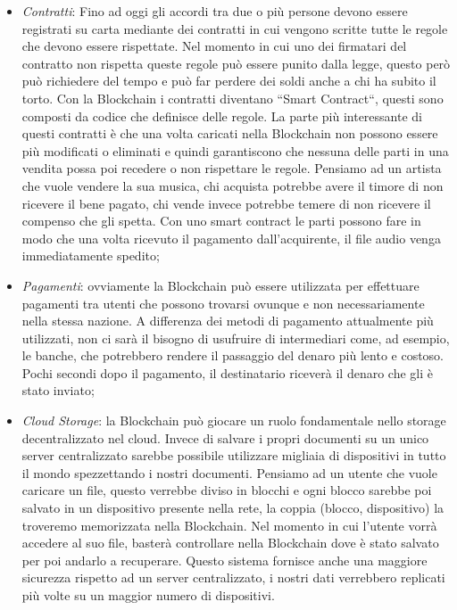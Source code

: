 \documentclass[12pt]{report}
\begin{document}
\begin{itemize}
\item \textit{Contratti}: Fino ad oggi gli accordi tra due o più persone devono essere registrati su carta mediante dei contratti in cui vengono scritte tutte le regole che devono essere rispettate. 
Nel momento in cui uno dei firmatari del contratto non rispetta queste regole può essere punito dalla legge, questo però può richiedere del tempo e può far perdere dei soldi anche a chi ha subito il torto.
Con la Blockchain i contratti diventano ``Smart Contract``, questi sono composti da codice che definisce delle regole.
La parte più interessante di questi contratti è che una volta caricati nella Blockchain non possono essere più modificati o eliminati e quindi garantiscono che nessuna delle parti in una vendita possa poi recedere o non rispettare le regole.
Pensiamo ad un artista che vuole vendere la sua musica, chi acquista potrebbe avere il timore di non ricevere il bene pagato, chi vende invece potrebbe temere di non ricevere il compenso che gli spetta.
Con uno smart contract le parti possono fare in modo che una volta ricevuto il pagamento dall'acquirente, il file audio venga immediatamente spedito;
\item \textit{Pagamenti}: ovviamente la Blockchain può essere utilizzata per effettuare pagamenti tra utenti che possono trovarsi ovunque e non necessariamente nella stessa nazione.
A differenza dei metodi di pagamento attualmente più utilizzati, non ci sarà il bisogno di usufruire di intermediari come, ad esempio, le banche, che potrebbero rendere il passaggio del denaro più lento e costoso.
Pochi secondi dopo il pagamento, il destinatario riceverà il denaro che gli è stato inviato;
\item \textit{Cloud Storage}: la Blockchain può giocare un ruolo fondamentale nello storage decentralizzato nel cloud. Invece di salvare i propri documenti su un unico server centralizzato sarebbe possibile utilizzare migliaia di dispositivi in tutto il mondo spezzettando i nostri documenti.
Pensiamo ad un utente che vuole caricare un file, questo verrebbe diviso in blocchi e ogni blocco sarebbe poi salvato in un dispositivo presente nella rete, la coppia (blocco, dispositivo) la troveremo memorizzata nella Blockchain. Nel momento in cui l'utente vorrà accedere al suo file, basterà controllare nella Blockchain dove è stato salvato per poi andarlo a recuperare.
Questo sistema fornisce anche una maggiore sicurezza rispetto ad un server centralizzato, i nostri dati verrebbero replicati più volte su un maggior numero di dispositivi.

\end{itemize}
\end{document}
